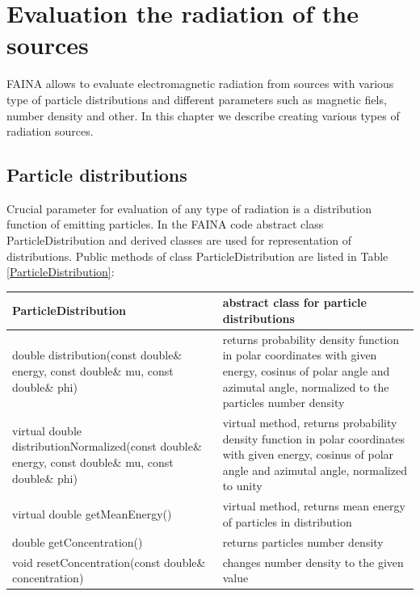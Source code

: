 \chapter{Evaluation the radiation of the sources}\label{radiation}
FAINA allows to evaluate electromagnetic radiation from sources with various type of particle distributions and different parameters such as magnetic fiels, number density and other. In this chapter we describe creating various types of radiation sources.

\section{Particle distributions}

Crucial parameter for evaluation of any type of radiation is a distribution function of emitting particles. In the FAINA code abstract class ParticleDistribution and derived classes are used for representation of distributions. Public methods of class ParticleDistribution are listed in Table \ref{ParticleDistribution}:

\begin{small}
		\label{ParticleDistribution}
		
		\begin{xtabular}{|p{0.45\textwidth}|p{0.55\textwidth}|}
			\hline
			\textbf{ParticleDistribution} & abstract class for particle distributions\\
			\hline
			double distribution(const double\& energy, const double\& mu, const double\& phi) & returns probability density function in polar coordinates with given energy, cosinus of polar angle and azimutal angle, normalized to the particles number density \\
			\hline
			virtual double distributionNormalized(const double\& energy, const double\& mu, const double\& phi) & virtual method, returns probability density function in polar coordinates with given energy, cosinus of polar angle and azimutal angle, normalized to unity\\
			\hline
			virtual double getMeanEnergy() & virtual method, returns mean energy of particles in distribution\\
			\hline
			double getConcentration() & returns particles number density\\
			\hline
			void resetConcentration(const double\& concentration) & changes number density to the given value\\
			\hline
		\end{xtabular}
\end{small}

